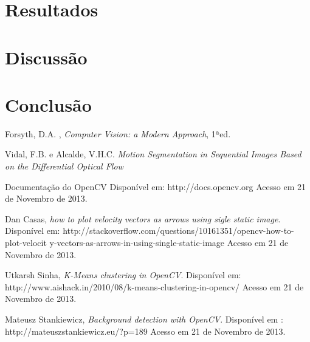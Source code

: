\documentclass[journal]{IEEEtran}
\begin{document}
\section{Resultados}
\section{Discussão}



\section{Conclusão}

\begin{thebibliography}{1}

Forsyth, D.A. , \emph{Computer Vision: a Modern Approach}, 1ªed.

  Vidal, F.B. e Alcalde, V.H.C. \emph{Motion Segmentation in 
Sequential 
  Images Based on the Differential Optical Flow} 

 Documentação do OpenCV
 Disponível em: http://docs.opencv.org
	 Acesso em 21 de Novembro de 2013.

    Dan Casas, \emph{how to plot velocity vectors as arrows using
                       sigle static image}.
    Disponível em: 
http://stackoverflow.com/questions/10161351/opencv-how-to-plot-velocit
y-vectors-as-arrows-in-using-single-static-image
    Acesso em 21 de Novembro de 2013.

    Utkarsh Sinha, \emph{K-Means clustering in OpenCV}.
    Disponível em: 
http://www.aishack.in/2010/08/k-means-clustering-in-opencv/
    Acesso em 21 de Novembro de 2013.

    Mateusz Stankiewicz, \emph{Background detection with OpenCV}.
    Disponível em : http://mateuszstankiewicz.eu/?p=189
    Acesso em 21 de Novembro de 2013. 
\end{thebibliography}
\end{document}

